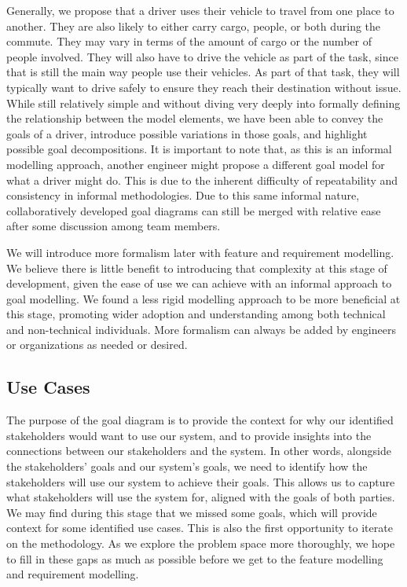 Generally, we propose that a driver uses their vehicle to travel from one place to another. They are also likely to either carry cargo, people, or both during the commute. They may vary in terms of the amount of cargo or the number of people involved. They will also have to drive the vehicle as part of the task, since that is still the main way people use their vehicles. As part of that task, they will typically want to drive safely to ensure they reach their destination without issue. While still relatively simple and without diving very deeply into formally defining the relationship between the model elements, we have been able to convey the goals of a driver, introduce possible variations in those goals, and highlight possible goal decompositions. It is important to note that, as this is an informal modelling approach, another engineer might propose a different goal model for what a driver might do. This is due to the inherent difficulty of repeatability and consistency in informal methodologies. Due to this same informal nature, collaboratively developed goal diagrams can still be merged with relative ease after some discussion among team members.

We will introduce more formalism later with feature and requirement modelling. We believe there is little benefit to introducing that complexity at this stage of development, given the ease of use we can achieve with an informal approach to goal modelling. We found a less rigid modelling approach to be more beneficial at this stage, promoting wider adoption and understanding among both technical and non-technical individuals. More formalism can always be added by engineers or organizations as needed or desired.

\subsection{Use Cases}

The purpose of the goal diagram is to provide the context for why our identified stakeholders would want to use our system, and to provide insights into the connections between our stakeholders and the system. In other words, alongside the stakeholders' goals and our system's goals, we need to identify how the stakeholders will use our system to achieve their goals. This allows us to capture what stakeholders will use the system for, aligned with the goals of both parties. We may find during this stage that we missed some goals, which will provide context for some identified use cases. This is also the first opportunity to iterate on the methodology. As we explore the problem space more thoroughly, we hope to fill in these gaps as much as possible before we get to the feature modelling and requirement modelling.

